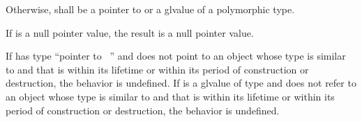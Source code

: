 \pnum
Otherwise,  shall be a pointer to or a glvalue of a polymorphic
type.

\pnum
If  is a null pointer value, the result is a null pointer value.

\pnum
If  has type ``pointer to \cv{}~'' and
 does not point to an object
whose type is similar to  and
that is
within its lifetime or
within its period of construction or destruction,
the behavior is undefined.
%
%
%
%
%
If  is a glvalue of type  and
 does not refer to an object
whose type is similar to  and
that is
within its lifetime or
within its period of construction or destruction,
the behavior is undefined.
%
%
%
%
%

